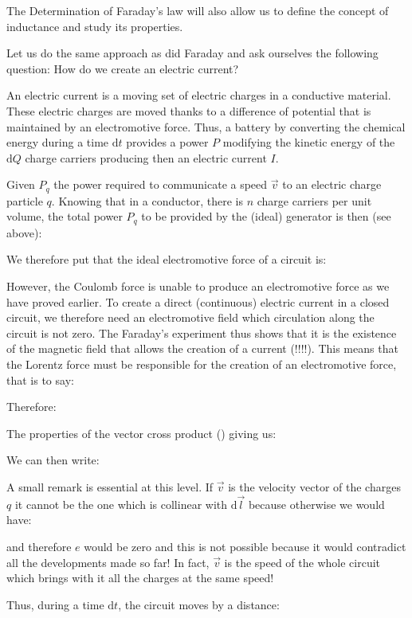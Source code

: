 	The Determination of Faraday's law will also allow us to define the concept of inductance and study its properties.

	Let us do the same approach as did Faraday and ask ourselves the following question: How do we create an electric current?

	An electric current is a moving set of electric charges in a conductive material. These electric charges are moved thanks to a difference of potential that is maintained by an electromotive force. Thus, a battery by converting the chemical energy during a time $\mathrm{d}t$ provides a power $P$ modifying the kinetic energy of the $\mathrm{d}Q$ charge carriers producing then an electric current $I$.

	Given $P_q$ the power required to communicate a speed $\vec{v}$ to an electric charge particle $q$. Knowing that in a conductor, there is $n$ charge carriers per unit volume, the total power $P_q$ to be provided by the (ideal) generator is then (see above):
	
	We therefore put that the ideal electromotive force of a circuit is:
	
	However, the Coulomb force is unable to produce an electromotive force as we have proved earlier. To create a direct (continuous) electric current in a closed circuit, we therefore need an electromotive field which circulation along the circuit is not zero. The Faraday's experiment thus shows that it is the existence of the magnetic field that allows the creation of a current (!!!!). This means that the Lorentz force must be responsible for the creation of an electromotive force, that is to say:
	
	Therefore:
	
	The properties of the vector cross product () giving us:
	
	We can then write:
	
	A small remark is essential at this level. If $\vec{v}$ is the velocity vector of the charges $q$ it cannot be the one which is collinear with $\mathrm{d}\vec{l}$ because otherwise we would have:
	
	and therefore $e$ would be zero and this is not possible because it would contradict all the developments made so far! In fact, $\vec{v}$ is the speed of the whole circuit which brings with it all the charges at the same speed!
	
	Thus, during a time $\mathrm{d}t$, the circuit moves by a distance:
	

